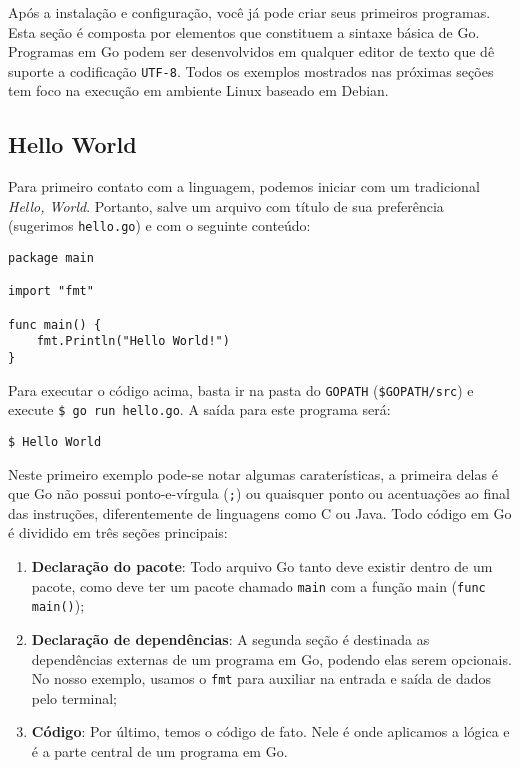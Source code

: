 \documentclass{SBCbookchapter}
\begin{document}
Após a instalação e configuração, você já pode criar seus primeiros programas. Esta seção é composta por elementos que constituem a sintaxe básica de Go. Programas em Go podem ser desenvolvidos em qualquer editor de texto que dê suporte a codificação \texttt{UTF-8}. Todos os exemplos mostrados nas próximas seções tem foco na execução em ambiente Linux baseado em Debian.

\subsection{Hello World}

Para primeiro contato com a linguagem, podemos iniciar com um tradicional \textit{Hello, World}. Portanto, salve um arquivo com título de sua preferência (sugerimos \texttt{hello.go}) e com o seguinte conteúdo:

\begin{lstlisting}
package main

import "fmt"

func main() {
	fmt.Println("Hello World!")
}
\end{lstlisting}

Para executar o código acima, basta ir na pasta do \texttt{GOPATH} (\texttt{\$GOPATH/src}) e execute \texttt{\$ go run hello.go}. A saída para este programa será:

\texttt{\$ Hello World}

Neste primeiro exemplo pode-se notar algumas caraterísticas, a primeira delas é que Go não possui ponto-e-vírgula (\texttt{;}) ou quaisquer ponto ou acentuações ao final das instruções, diferentemente de linguagens como C ou Java. Todo código em Go é dividido em três seções principais: 

\begin{enumerate}
	\item \textbf{Declaração do pacote}: Todo arquivo Go tanto deve existir dentro de um pacote, como deve ter um pacote chamado \texttt{main} com a função main (\texttt{func main()});
	\item \textbf{Declaração de dependências}: A segunda seção é destinada as dependências externas de um programa em Go, podendo elas serem opcionais. No nosso exemplo, usamos o \texttt{fmt} para auxiliar na entrada e saída de dados pelo terminal;
	\item \textbf{Código}: Por último, temos o código de fato. Nele é onde aplicamos a lógica e é a parte central de um programa em Go.
\end{enumerate}
\end{document}
